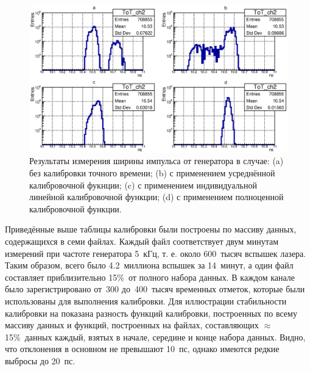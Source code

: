 \begin{figure}[H]
\centering
\includegraphics[width=1.0\textwidth]{pictures/20_ToT_ch2.eps}
\caption{Результаты измерения ширины импульса от генератора в случае: (a) без калибровки точного времени; (b) с применением усреднённой калибровочной фукнции; (c) с применением индивидуальной линейной калибровочной функции; (d) с применением полноценной калибровочной функции.}
\label{fig:FourToT}
\end{figure}

Приведённые выше таблицы калибровки были построены по массиву данных, содержащихся в семи файлах. Каждый файл соответствует двум минутам измерений при частоте генератора 5~кГц, т. е. около 600~тысяч вспышек лазера. Таким образом, всего было 4.2~миллиона вспышек за 14~минут, а один файл составляет приблизительно 15\%~от полного набора данных. В каждом канале было зарегистрировано от~300 до~400~тысяч временных отметок, которые были использованы для выполнения калибровки. Для иллюстрации стабильности калибровки на  показана разность функций калибровки, построенных по всему массиву данных и функций, построенных на файлах, составляющих $ \approx $15\%~данных каждый, взятых в начале, середине и конце набора данных. Видно, что отклонения в основном не превышают 10~пс, однако имеются редкие выбросы до 20~пс.

